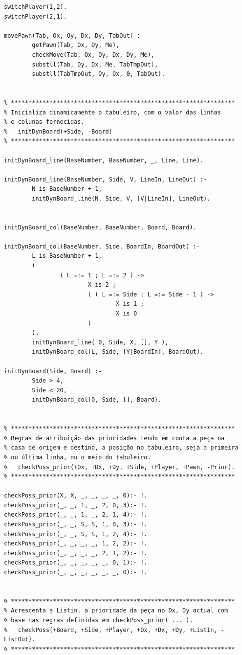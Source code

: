 \documentclass[15pt,a4paper]{article}
\begin{document}
\begin{lstlisting}
switchPlayer(1,2).
switchPlayer(2,1).

movePawn(Tab, Ox, Oy, Dx, Dy, TabOut) :-
		getPawn(Tab, Ox, Oy, Me),
		checkMove(Tab, Ox, Oy, Dx, Dy, Me),
		substll(Tab, Dy, Dx, Me, TabTmpOut),
		substll(TabTmpOut, Oy, Ox, 0, TabOut).
	

% ****************************************************************
% Inicializa dinamicamente o tabuleiro, com o valor das linhas
% e colunas fornecidas.
%	initDynBoard(+Side, -Board)
% ****************************************************************

initDynBoard_line(BaseNumber, BaseNumber, _, Line, Line).

initDynBoard_line(BaseNumber, Side, V, LineIn, LineOut) :-
		N is BaseNumber + 1,
		initDynBoard_line(N, Side, V, [V|LineIn], LineOut).
		
                
initDynBoard_col(BaseNumber, BaseNumber, Board, Board).

initDynBoard_col(BaseNumber, Side, BoardIn, BoardOut) :-
		L is BaseNumber + 1,
		(
				( L =:= 1 ; L =:= 2 ) ->
						X is 2 ;
						( ( L =:= Side ; L =:= Side - 1 ) ->
								X is 1 ;
								X is 0
						)
		),
		initDynBoard_line( 0, Side, X, [], Y ),
		initDynBoard_col(L, Side, [Y|BoardIn], BoardOut).

initDynBoard(Side, Board) :-
		Side > 4,
		Side < 20,
		initDynBoard_col(0, Side, [], Board).
        
        
% ****************************************************************
% Regras de atribuição das prioridades tendo em conta a peça na
% casa de origem e destino, a posição no tabuleiro, seja a primeira
% ou última linha, ou o meio do tabuleiro.
%	checkPoss_prior(+Ox, +Dx, +Dy, +Side, +Player, +Pawn, -Prior).
% ****************************************************************      

checkPoss_prior(X, X, _, _, _, _, 0):- !.
checkPoss_prior(_, _, 1, _, 2, 0, 3):- !.
checkPoss_prior(_, _, 1, _, 2, 1, 4):- !.
checkPoss_prior(_, _, S, S, 1, 0, 3):- !.
checkPoss_prior(_, _, S, S, 1, 2, 4):- !.
checkPoss_prior(_, _, _, _, 1, 2, 2):- !.
checkPoss_prior(_, _, _, _, 2, 1, 2):- !.
checkPoss_prior(_, _, _, _, _, 0, 1):- !.
checkPoss_prior(_, _, _, _, _, _, 0):- !.


% ****************************************************************
% Acrescenta a Listin, a prioridade da peça no Dx, Dy actual com
% base nas regras definidas em checkPoss_prior( ... ).
%	checkPoss(+Board, +Side, +Player, +Ox, +Dx, +Dy, +ListIn, -ListOut).
% ****************************************************************      


\end{lstlisting}
\end{document}

